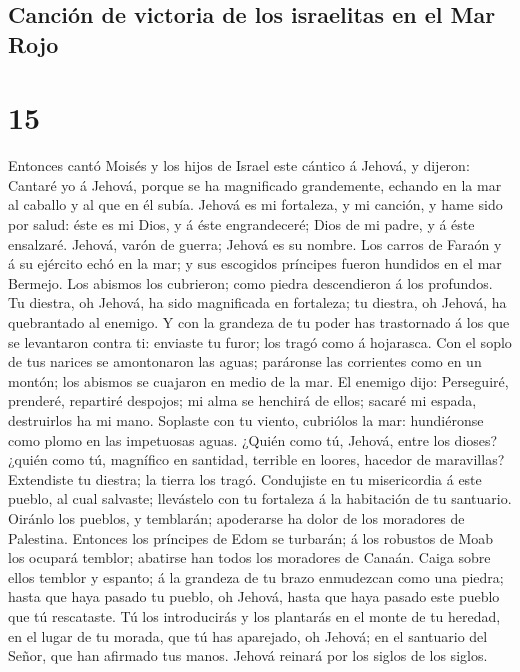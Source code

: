 \hypertarget{canciuxf3n-de-victoria-de-los-israelitas-en-el-mar-rojo}{%
\subsection{Canción de victoria de los israelitas en el Mar
Rojo}\label{canciuxf3n-de-victoria-de-los-israelitas-en-el-mar-rojo}}

\hypertarget{section-02-15}{%
\section{15}\label{section-02-15}}

 Entonces cantó Moisés y los hijos de Israel este cántico
á Jehová, y dijeron: Cantaré yo á Jehová, porque se ha magnificado
grandemente, echando en la mar al caballo y al que en él subía.
 Jehová es mi fortaleza, y mi canción, y hame sido por
salud: éste es mi Dios, y á éste engrandeceré; Dios de mi padre, y á
éste ensalzaré.  Jehová, varón de guerra; Jehová es su
nombre.  Los carros de Faraón y á su ejército echó en la
mar; y sus escogidos príncipes fueron hundidos en el mar Bermejo.
 Los abismos los cubrieron; como piedra descendieron á los
profundos.  Tu diestra, oh Jehová, ha sido magnificada en
fortaleza; tu diestra, oh Jehová, ha quebrantado al enemigo.
 Y con la grandeza de tu poder has trastornado á los que
se levantaron contra ti: enviaste tu furor; los tragó como á hojarasca.
 Con el soplo de tus narices se amontonaron las aguas;
paráronse las corrientes como en un montón; los abismos se cuajaron en
medio de la mar.  El enemigo dijo: Perseguiré, prenderé,
repartiré despojos; mi alma se henchirá de ellos; sacaré mi espada,
destruirlos ha mi mano.  Soplaste con tu viento,
cubriólos la mar: hundiéronse como plomo en las impetuosas aguas.
 ¿Quién como tú, Jehová, entre los dioses? ¿quién como
tú, magnífico en santidad, terrible en loores, hacedor de maravillas?
 Extendiste tu diestra; la tierra los tragó.
 Condujiste en tu misericordia á este pueblo, al cual
salvaste; llevástelo con tu fortaleza á la habitación de tu santuario.
 Oiránlo los pueblos, y temblarán; apoderarse ha dolor de
los moradores de Palestina.  Entonces los príncipes de
Edom se turbarán; á los robustos de Moab los ocupará temblor; abatirse
han todos los moradores de Canaán.  Caiga sobre ellos
temblor y espanto; á la grandeza de tu brazo enmudezcan como una piedra;
hasta que haya pasado tu pueblo, oh Jehová, hasta que haya pasado este
pueblo que tú rescataste.  Tú los introducirás y los
plantarás en el monte de tu heredad, en el lugar de tu morada, que tú
has aparejado, oh Jehová; en el santuario del Señor, que han afirmado
tus manos.  Jehová reinará por los siglos de los siglos.

